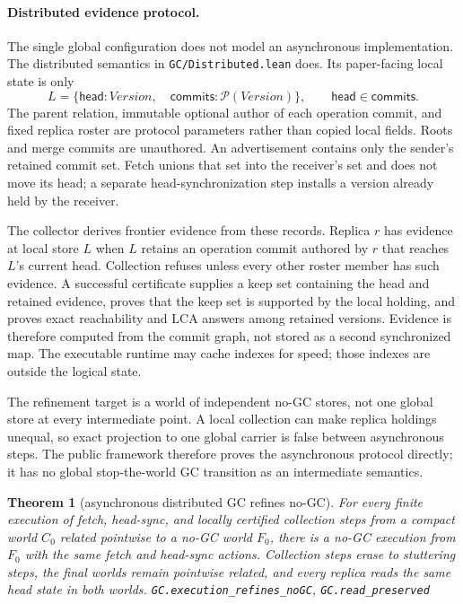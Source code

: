 \documentclass[11pt]{article}
\newtheorem{theorem}{Theorem}[section]
\newcommand{\lean}[1]{\texttt{#1}}
\newcommand{\code}[1]{\texttt{#1}}
\begin{document}
\paragraph{Distributed evidence protocol.} The single global configuration
does not model an asynchronous implementation. The distributed semantics in
\code{GC/Distributed.lean} does. Its paper-facing local state is only
\[
  L = \{\mathsf{head}:\mathit{Version},\quad
        \mathsf{commits}:\mathcal P(\mathit{Version})\},
  \qquad \mathsf{head}\in\mathsf{commits}.
\]
The parent relation, immutable optional author of each operation commit, and
fixed replica roster are protocol parameters rather than copied local fields.
Roots and merge commits are unauthored. An advertisement contains only the
sender's retained commit set. Fetch unions that set into the receiver's set
and does not move its head; a separate head-synchronization step installs a
version already held by the receiver.

The collector derives frontier evidence from these records. Replica $r$ has
evidence at local store $L$ when $L$ retains an operation commit authored by
$r$ that reaches $L$'s current head. Collection refuses unless every other
roster member has such evidence. A successful certificate supplies a keep set
containing the head and retained evidence, proves that the keep set is
supported by the local holding, and proves exact reachability and LCA answers
among retained versions. Evidence is therefore computed from the commit graph,
not stored as a second synchronized map. The executable runtime may cache
indexes for speed; those indexes are outside the logical state.

The refinement target is a world of independent no-GC stores, not one global
store at every intermediate point. A local collection can make replica
holdings unequal, so exact projection to one global carrier is false between
asynchronous steps. The public framework therefore proves the asynchronous
protocol directly; it has no global stop-the-world GC transition as an
intermediate semantics.

\begin{theorem}[asynchronous distributed GC refines no-GC]
\label{thm:distributedgc}
For every finite execution of fetch, head-sync, and locally certified
collection steps from a compact world $C_0$ related pointwise to a no-GC world
$F_0$, there is a no-GC execution from $F_0$ with the same fetch and head-sync
actions. Collection steps erase to stuttering steps, the final worlds remain
pointwise related, and every replica reads the same head state in both worlds.
\hfill\lean{GC.execution\_refines\_noGC},
\lean{GC.read\_preserved}
\end{theorem}
\end{document}
